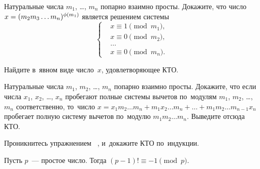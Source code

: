 \begin{problems}

\item
\subproblem
Натуральные числа $m_{1}$, \ldots, $m_{n}$ попарно взаимно просты.
Докажите, что число $x = (m_{2} m_{3} \ldots m_{n})^{\phi(m_{1})}$
является решением системы
\[ \left\{ \begin{aligned} &
    x \equiv 1 \pmod {m_1}
, \\ &
    x \equiv 0 \pmod {m_2}
, \\ & \ldots \\ &
    x \equiv 0 \pmod {m_n}
. \end{aligned} \right. \]
\par
\subproblem
Найдите в~явном виде число~$x$, удовлетворяющее КТО.

\item
Натуральные числа $m_{1}$, $m_{2}$, \ldots, $m_{n}$ попарно взаимно просты.
Докажите, что если числа $x_{1}$, $x_{2}$, \ldots, $x_{n}$ пробегают полные
системы вычетов по~модулям $m_{1}$, $m_{2}$, \ldots, $m_{n}$ соответственно,
то~число
\(
    x
=
    x_{1} m_{2} \ldots m_{n} + m_{1} x_{2} \ldots m_{n}
    + \ldots +
    m_{1} m_{2} \ldots m_{n-1} x_{n}
\) пробегает полную систему вычетов по~модулю $m_{1} m_{2} \ldots m_{n}$.
Выведите отсюда КТО.

\item
Проникнитесь упражнением~%
,
и~докажите КТО по~индукции.

\end{problems}

Пусть $p$~--- простое число.
Тогда $(p - 1)! \equiv -1 \pmod p$.

